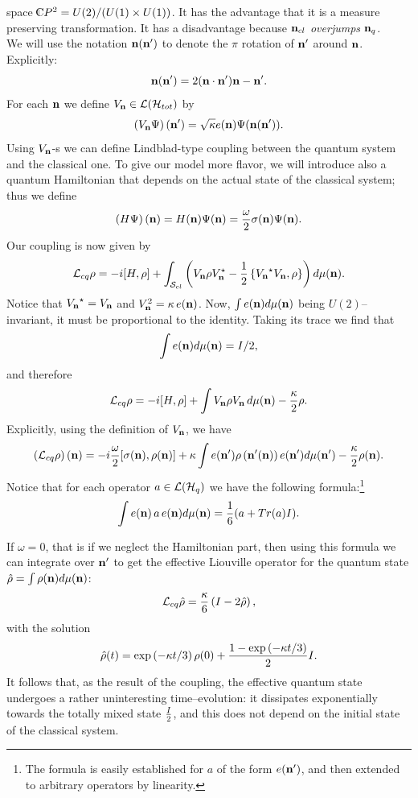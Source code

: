 \documentclass[12pt]{article}
\def\complex{{\kern .1em {\raise .47ex \hbox
{$\scriptscriptstyle
|$}}
\kern -.4em {\rm C}}}
\def\be{\begin{equation}} \def\ee{\end{equation}}
\begin{document}
space $\complex P^2=U (2)/ (U (1)\times U (1))$. 
It has
the advantage that it is a measure preserving transformation.  It has
a disadvantage because ${\bf n}_{cl}$ {\em overjumps} ${\bf n}_q$.  \\
We will
use the notation ${\bf n} ({\bf n}')$ to denote the $\pi$ rotation of 
${\bf n}'$ around ${\bf n}$.  Explicitly: 
$${\bf n} ({\bf n}')=2 ({\bf n\cdot n}'){\bf n}-{\bf n}' . $$
For each ${\bf n}$ we define $V_{\bf n}\in {\cal L} ({\cal H}_{tot})$
by
\be
\left ( V_{\bf n}\Psi\right)
 ({\bf n}')=\sqrt{\kappa} e ({\bf n})\Psi ({\bf n} (
{\bf n}')). 
\ee
Using $V_{\bf n}$-s we can define Lindblad-type coupling between the quantum 
system and the classical one.  To give our model more flavor,  we will
introduce also a quantum Hamiltonian that depends on the actual state
of the classical system; thus we define
\be
\left ( H\Psi\right) ({\bf n})=
H ({\bf n})\Psi ({\bf n}) = {\omega\over2}\sigma  ({\bf n})\Psi  ({\bf n}). 
\ee
Our coupling is now given by
\be
{\cal L}_{cq} \rho = -i[H, \rho ] +\int_{{\cal S}_{cl}} \left ( V_{\bf n}\rho
V_{\bf n}^{\star}-{1\over2}
\left\{ {V_{\bf n}}^{\star} V_{\bf n}, \rho\right\}\right) d\mu  ({\bf n}). 
\ee 
Notice that ${V_{\bf n}}^{\star}=
V_{\bf n}$ and $V_{\bf n}^2=\kappa\,  e ({\bf n})$. 
Now, 
$\int e ({\bf n}) d\mu  ({\bf n})$ being $U (2)$--invariant,  it must be
proportional to the identity.  Taking its trace we find that
$$\int e ({\bf n}) d\mu  ({\bf n}) = I/2 , $$  
and therefore
\be
{\cal L}_{cq}\rho=-i[H, \rho]+\int  V_{\bf
n}\rho V_{\bf n}\,  d\mu  ({\bf n}) -{\kappa\over 2} \rho . 
\ee 
Explicitly,  using the definition of $V_{\bf n}$,  we have
\be
 \left ({\cal L}_{cq}\rho\right) ({\bf n}) =
 -i{\omega\over2}[\sigma ({\bf n}), \rho ({\bf n})]+
 \kappa\int e ({\bf n'})\rho\left ({\bf
n'}  ({\bf n})\right)e ({\bf n'}) d\mu  ({\bf n'}) -{\kappa\over 2} \rho ({\bf n}). 
\ee
Notice that for each operator $a\in{\cal L} ({\cal H}_q)$
we have the following formula:\footnote{The formula 
is easily established for $a$
of the form $e ({\bf n'})$,  and 
then extended to arbitrary operators by linearity. }
\be
\int e ({\bf n})\,  a\,  e ({\bf n}) d\mu  ({\bf n})={1\over 6} (a+Tr (a)I). 
\ee

If $\omega=0$,  that is if we neglect the Hamiltonian part,  then
using this formula we can integrate
over $ {\bf n'}$ to get the effective Liouville operator for the
quantum state ${\hat\rho}=\int \rho ({\bf n}) d\mu  ({\bf
n})$: 
\be
 {\cal L}_{cq}{\hat\rho}={\kappa\over6}\left (I-2{\hat\rho}\right), 
\ee
with the solution
\be
{\hat\rho} (t)=\exp\left ({-\kappa t}/3\right)\rho (0)+{1-\exp\left ({-\kappa
t}/3\right)\over 2}I. 
\ee
It follows that,  as the result of the coupling,  the effective quantum state
undergoes a rather uninteresting time--evolution:  it
dissipates exponentially towards the totally mixed state ${I\over2}$,  and this
 does not depend on the initial state of the classical system.
\end{document}

